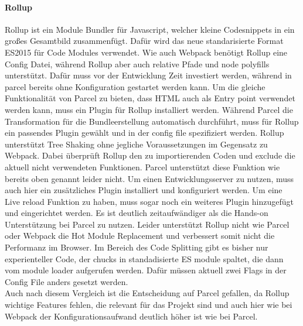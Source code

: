 \paragraph{Rollup}Rollup ist ein Module Bundler für Javascript, welcher kleine Codesnippets in ein großes Gesamtbild zusammenfügt. Dafür wird das neue standarisierte Format ES2015 für Code Modules verwendet. Wie auch Webpack benötigt Rollup eine Config Datei, während Rollup aber auch relative Pfade und node polyfills unterstützt. Dafür muss vor der Entwicklung Zeit investiert werden, während in parcel bereits ohne Konfiguration gestartet werden kann. Um die gleiche Funktionalität von Parcel zu bieten, dass HTML auch als Entry point verwendet werden kann, muss ein Plugin für Rollup installiert werden. Während Parcel die Transformation für die Bundleerstellung automatisch durchführt, muss für Rollup ein passendes Plugin gewählt und in der config file spezifiziert werden.  Rollup unterstützt Tree Shaking ohne jegliche Voraussetzungen im Gegensatz zu Webpack. Dabei überprüft Rollup den zu importierenden Coden und exclude die aktuell nicht verwendeten Funktionen. Parcel unterstützt diese Funktion wie bereits oben genannt leider nicht. Um einen Entwicklungsserver zu nutzen, muss auch hier ein zusätzliches Plugin installiert und konfiguriert werden. Um eine Live reload Funktion zu haben, muss sogar noch ein weiteres Plugin hinzugefügt und eingerichtet werden. Es ist deutlich zeitaufwändiger als die Hands-on Unterstützung bei Parcel zu nutzen. Leider unterstützt Rollup nicht wie Parcel oder Webpack die Hot Module Replacement und verbessert somit nicht die Performanz im Browser. Im Bereich des Code Splitting gibt es bisher nur experienteller Code, der chucks in standadisierte ES module spaltet, die dann vom module loader aufgerufen werden. Dafür müssen aktuell zwei Flags in der Config File anders gesetzt werden.
\\
Auch nach diesem Vergleich ist die Entscheidung auf Parcel gefallen, da Rollup wichtige Features fehlen, die relevant für das Projekt sind und auch hier wie bei Webpack der Konfigurationsaufwand deutlich höher ist wie bei Parcel.

